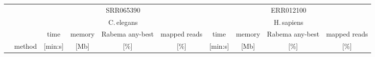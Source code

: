 \begin{tabular}{llrrccrrcc}
\midrule
  
  & \multirow{2}{*}{}  &\multicolumn{ 4 }{c}{  SRR065390 } &\multicolumn{ 4 }{c}{  ERR012100 } \\
  &&\multicolumn{4}{c}{C.\,elegans}&\multicolumn{4}{c}{H.\,sapiens} \\
  \cmidrule(lr){3-6}\cmidrule(lr){7-10} 
  &  &\multicolumn{1}{c}{  time } &\multicolumn{1}{c}{  memory } &\multicolumn{1}{c}{  Rabema any-best } &\multicolumn{1}{c}{  mapped reads } &\multicolumn{1}{c}{  time } &\multicolumn{1}{c}{  memory } &\multicolumn{1}{c}{  Rabema any-best } &\multicolumn{1}{c}{  mapped reads } \\
  & method  &\multicolumn{1}{c}{  [min:s] } &\multicolumn{1}{c}{  [Mb] } &\multicolumn{1}{c}{  [\%] } &\multicolumn{1}{c}{  [\%] } &\multicolumn{1}{c}{  [min:s] } &\multicolumn{1}{c}{  [Mb] } &\multicolumn{1}{c}{  [\%] } &\multicolumn{1}{c}{  [\%] } \\

  \midrule


\end{tabular}
